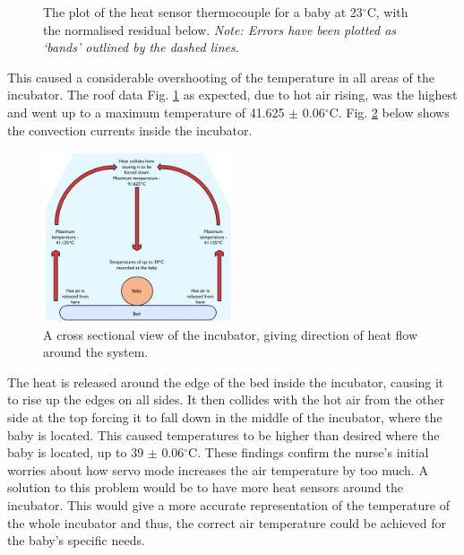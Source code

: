 \documentclass{article}
\begin{document}
\begin{figure}[H]
\begin{minipage}{.48\linewidth}
    \caption{The plot of the heat sensor thermocouple for a baby at 23$^{\circ}$C, with the normalised residual below. \textit{Note: Errors have been plotted as ‘bands’ outlined by the dashed lines}.}
    \label{ROOF 23C}
    \end{minipage}
\end{figure}

This caused a considerable overshooting of the temperature in all areas of the incubator. The roof data Fig. \ref{ROOF 23C} as expected, due to hot air rising, was the highest and went up to a maximum temperature of 41.625 $\pm$ 0.06$^{\circ}$C. Fig. \ref{Cross section} below shows the convection currents inside the incubator.

\begin{figure}[!h]
    \centering
    \captionsetup{justification=centering,margin=1cm}
    \includegraphics[width=0.5\textwidth]{Servo CS.png}
    \caption{A cross sectional view of the incubator, giving direction of heat flow around the system.}
    \label{Cross section}
\end{figure}

\vspace{3mm}

The heat is released around the edge of the bed inside the incubator, causing it to rise up the edges on all sides. It then collides with the hot air from the other side at the top forcing it to fall down in the middle of the incubator, where the baby is located. This caused temperatures to be higher than desired where the baby is located, up to 39 $\pm$ 0.06$^{\circ}$C. These findings confirm the nurse's initial worries about how servo mode increases the air temperature by too much. A solution to this problem would be to have more heat sensors around the incubator. This would give a more accurate representation of the temperature of the whole incubator and thus, the correct air temperature could be achieved for the baby’s specific needs.
 
\end{document}
